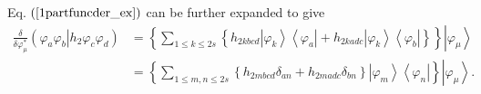 \documentclass[aps,preprint]{revtex4}%
\begin{document}
Eq. $\left(  \ref{1partfuncder_ex}\right)  $ can be further expanded to give
\begin{align}
\frac{\delta}{\delta\varphi_{\mu}^{\ast}}\left(  \left.  \varphi_{a}%
\varphi_{b}\right\vert h_{2}\varphi_{c}\varphi_{d}\right)   &  =\left\{
\sum_{1\leq k\leq2s}\left\{  h_{2kbcd}\left\vert \varphi_{k}\right\rangle
\left\langle \varphi_{a}\right\vert +h_{2kadc}\left\vert \varphi
_{k}\right\rangle \left\langle \varphi_{b}\right\vert \right\}  \right\}
\left\vert \varphi_{\mu}\right\rangle \nonumber\\
&  =\left\{  \sum_{1\leq m,n\leq2s}\left\{  h_{2mbcd}\delta_{an}%
+h_{2madc}\delta_{bn}\right\}  \left\vert \varphi_{m}\right\rangle
\left\langle \varphi_{n}\right\vert \right\}  \left\vert \varphi_{\mu
}\right\rangle . \label{2partfuncder_ex}%
\end{align}
\end{document}
